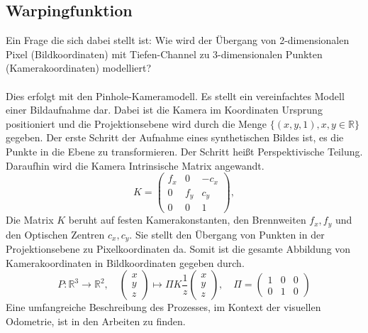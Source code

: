 \documentclass[12pt,DIV=15,BCOR=15mm,twoside,headsepline,abstract=true,listof=totoc,bibliography=totoc]{scrreprt}
\theoremstyle{remark}    %
\begin{document}
    \subsection{Warpingfunktion}\label{sec:warp}
    Ein Frage die sich dabei stellt ist: Wie wird der Übergang von 2-dimensionalen Pixel (Bildkoordinaten) mit Tiefen-Channel zu 3-dimensionalen Punkten 
    (Kamerakoordinaten) modelliert?\\\\
    Dies erfolgt mit den Pinhole-Kameramodell. Es stellt ein vereinfachtes Modell einer Bildaufnahme dar. 
    Dabei ist die Kamera im Koordinaten
    Ursprung positioniert und die Projektionsebene wird durch die Menge $\{(x,y,1), x,y \in \mathbb{R}\}$ gegeben. 
    Der erste Schritt der Aufnahme eines synthetischen Bildes ist, es die Punkte in die Ebene zu transformieren. Der
    Schritt heißt Perspektivische Teilung.
    Daraufhin wird die Kamera Intrinsische Matrix angewandt.
    \[
    K =  \begin{pmatrix}
        f_x & 0 & -c_x \\[6pt]
        0 & f_y & c_y \\[6pt]
        0 & 0 & 1
        \end{pmatrix},
    \]    
    Die Matrix $K$ beruht auf festen Kamerakonstanten, den Brennweiten $f_x, f_y$ und den Optischen Zentren $c_x, c_y$. Sie stellt den Übergang von Punkten 
    in der Projektionsebene zu Pixelkoordinaten da.
    Somit ist die gesamte Abbildung von Kamerakoordinaten in Bildkoordinaten gegeben durch.
    \[  
       P: \mathbb{R}^3 \to \mathbb{R}^2, \hspace{1em} \begin{pmatrix} x\\y\\z \end{pmatrix} \mapsto \Pi K \frac{1}{z} \begin{pmatrix} x\\y\\z \end{pmatrix}
       , \hspace{1em} \Pi = \begin{pmatrix}1 & 0 & 0 \\ 0 & 1 & 0 \end{pmatrix}
    \]
    Eine umfangreiche Beschreibung des Prozesses, im Kontext der visuellen Odometrie, ist in den Arbeiten \cite{djema2023densevisualodometryusing,Park_2017_ICCV} zu finden.\\\\
\end{document}
